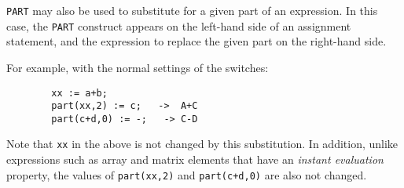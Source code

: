 {\tt PART} may also be used to substitute for a given part of an
expression.  In this case, the {\tt PART} construct appears on the
left-hand side of an assignment statement, and the expression to replace
the given part on the right-hand side.

For example, with the normal settings of the {\REDUCE} switches:
\begin{verbatim}
        xx := a+b;
        part(xx,2) := c;   ->  A+C
        part(c+d,0) := -;   -> C-D
\end{verbatim}

Note that {\tt xx} in the above is not changed by this substitution.  In
addition, unlike expressions such as array and matrix elements that have
an {\em instant evaluation\/} property, the values
of {\tt part(xx,2)} and {\tt part(c+d,0)} are also not changed.
